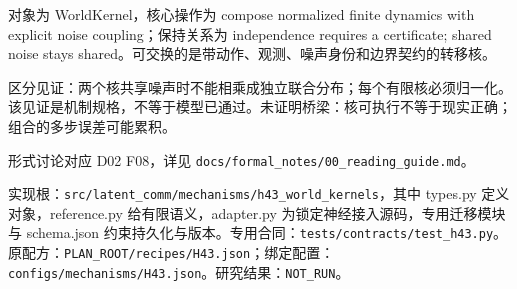 \documentclass[
  10pt,
]{article}
\begin{document}
对象为 WorldKernel，核心操作为 compose normalized finite dynamics with
explicit noise coupling；保持关系为 independence requires a certificate;
shared noise stays
shared。可交换的是带动作、观测、噪声身份和边界契约的转移核。

区分见证：两个核共享噪声时不能相乘成独立联合分布；每个有限核必须归一化。
该见证是机制规格，不等于模型已通过。未证明桥梁：核可执行不等于现实正确；组合的多步误差可能累积。

形式讨论对应 D02 F08，详见
{\small\nolinkurl{docs/formal_notes/00_reading_guide.md}}。

实现根：{\small\nolinkurl{src/latent_comm/mechanisms/h43_world_kernels}}，其中
types.py 定义对象，reference.py 给有限语义，adapter.py
为锁定神经接入源码，专用迁移模块与 schema.json
约束持久化与版本。专用合同：{\small\nolinkurl{tests/contracts/test_h43.py}}。原配方：{\small\nolinkurl{PLAN_ROOT/recipes/H43.json}}；绑定配置：{\small\nolinkurl{configs/mechanisms/H43.json}}。研究结果：\nolinkurl{NOT_RUN}。
\end{document}
